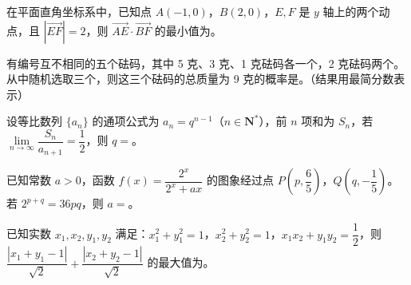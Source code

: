 \begin{question}
在平面直角坐标系中，已知点 $A(-1, 0)$，$B(2, 0)$，$E, F$ 是 $y$ 轴上的两个动点，且 $|\vec{EF}| = 2$，则 $\vec{AE} \cdot \vec{BF}$ 的最小值为\gkblank{}。

\end{question}
\begin{question}
有编号互不相同的五个砝码，其中 5 克、3 克、1 克砝码各一个，2 克砝码两个。从中随机选取三个，则这三个砝码的总质量为 9 克的概率是\gkblank{}。（结果用最简分数表示）

\end{question}
\begin{question}
设等比数列 $\{a_n\}$ 的通项公式为 $a_n = q^{n-1}$（$n \in \mathbf{N}^*$），前 $n$ 项和为 $S_n$，若 $\lim\limits_{n \to \infty} \dfrac{S_n}{a_{n+1}} = \dfrac{1}{2}$，则 $q =$\gkblank{}。

\end{question}
\begin{question}
已知常数 $a > 0$，函数 $f(x) = \dfrac{2^x}{2^x + ax}$ 的图象经过点 $P\left(p, \dfrac{6}{5}\right)$，$Q\left(q, -\dfrac{1}{5}\right)$。若 $2^{p+q} = 36pq$，则 $a =$\gkblank{}。

\end{question}
\begin{question}
已知实数 $x_1, x_2, y_1, y_2$ 满足：$x_1^2 + y_1^2 = 1$，$x_2^2 + y_2^2 = 1$，$x_1 x_2 + y_1 y_2 = \dfrac{1}{2}$，则 $\dfrac{|x_1 + y_1 - 1|}{\sqrt{2}} + \dfrac{|x_2 + y_2 - 1|}{\sqrt{2}}$ 的最大值为\gkblank{}。

\par\medskip

\end{question}

